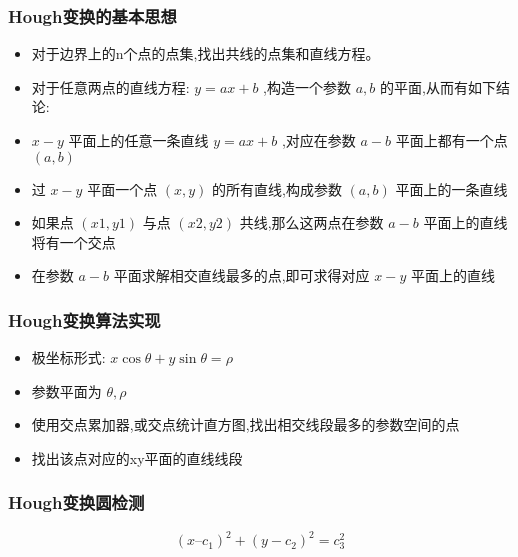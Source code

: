 \documentclass{beamer}
\begin{document}
\begin{frame}
\frametitle{Hough变换的基本思想}
\label{sec-3-5}

\begin{itemize}
\item 对于边界上的n个点的点集,找出共线的点集和直线方程。
\item 对于任意两点的直线方程: $y=ax+b$ ,构造一个参数 $a,b$ 的平面,从而有如下结论:
\item $x-y$ 平面上的任意一条直线 $y=ax+b$ ,对应在参数 $a-b$ 平面上都有一个点 $(a,b)$
\item 过 $x-y$ 平面一个点 $(x,y)$ 的所有直线,构成参数 $(a,b)$ 平面上的一条直线
\item 如果点 $(x1,y1)$ 与点 $(x2,y2)$ 共线,那么这两点在参数 $a-b$ 平面上的直线将有一个交点
\item 在参数 $a-b$ 平面求解相交直线最多的点,即可求得对应 $x-y$ 平面上的直线
\end{itemize}
\end{frame}
\begin{frame}
\frametitle{Hough变换算法实现}
\label{sec-3-6}

\begin{itemize}
\item 极坐标形式: $x\cos\theta+y\sin\theta=\rho$
\item 参数平面为 $\theta,\rho$
\item 使用交点累加器,或交点统计直方图,找出相交线段最多的参数空间的点
\item 找出该点对应的xy平面的直线线段
\end{itemize}
\end{frame}
\begin{frame}
\frametitle{Hough变换圆检测}
\label{sec-3-7}


    \[(x–c_1)^2 + (y - c_2)^2 = c_3^2\]
\end{frame}
\end{document}

